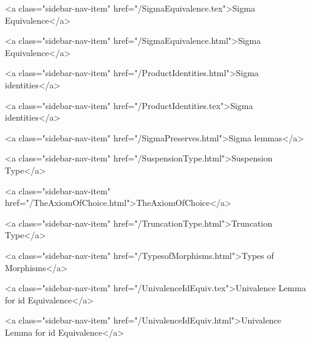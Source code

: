       
        
          <a class="sidebar-nav-item" href="/SigmaEquivalence.tex">Sigma Equivalence</a>
        
      
    
      
        
          <a class="sidebar-nav-item" href="/SigmaEquivalence.html">Sigma Equivalence</a>
        
      
    
      
        
          <a class="sidebar-nav-item" href="/ProductIdentities.html">Sigma identities</a>
        
      
    
      
        
          <a class="sidebar-nav-item" href="/ProductIdentities.tex">Sigma identities</a>
        
      
    
      
        
          <a class="sidebar-nav-item" href="/SigmaPreserves.html">Sigma lemmas</a>
        
      
    
      
        
          <a class="sidebar-nav-item" href="/SuspensionType.html">Suspension Type</a>
        
      
    
      
        
          <a class="sidebar-nav-item" href="/TheAxiomOfChoice.html">TheAxiomOfChoice</a>
        
      
    
      
        
          <a class="sidebar-nav-item" href="/TruncationType.html">Truncation Type</a>
        
      
    
      
        
          <a class="sidebar-nav-item" href="/TypesofMorphisms.html">Types of Morphisms</a>
        
      
    
      
        
          <a class="sidebar-nav-item" href="/UnivalenceIdEquiv.tex">Univalence Lemma for id Equivalence</a>
        
      
    
      
        
          <a class="sidebar-nav-item" href="/UnivalenceIdEquiv.html">Univalence Lemma for id Equivalence</a>
        
